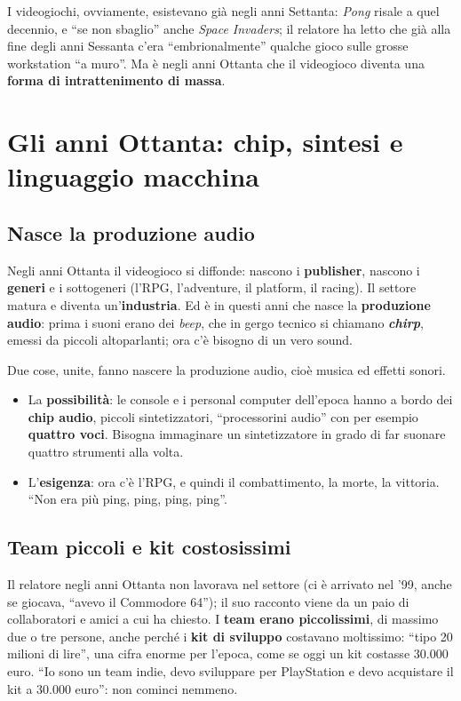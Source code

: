 I videogiochi, ovviamente, esistevano già negli anni Settanta: \emph{Pong} risale
a quel decennio, e ``se non sbaglio'' anche \emph{Space Invaders}; il relatore ha
letto che già alla fine degli anni Sessanta c'era ``embrionalmente'' qualche
gioco sulle grosse workstation ``a muro''. Ma è negli anni Ottanta che il
videogioco diventa una \textbf{forma di intrattenimento di massa}.

\section{Gli anni Ottanta: chip, sintesi e linguaggio macchina}
\label{z9:sec:anni80}

\subsection{Nasce la produzione audio}

Negli anni Ottanta il videogioco si diffonde: nascono i \textbf{publisher},
nascono i \textbf{generi} e i sottogeneri (l'RPG, l'adventure, il platform, il
racing). Il settore matura e diventa un'\textbf{industria}. Ed è in questi anni
che nasce la \textbf{produzione audio}: prima i suoni erano dei \emph{beep}, che
in gergo tecnico si chiamano \textbf{\emph{chirp}}, emessi da piccoli
altoparlanti; ora c'è bisogno di un vero sound.

Due cose, unite, fanno nascere la produzione audio, cioè musica ed effetti
sonori.
\begin{itemize}
  \item La \textbf{possibilità}: le console e i personal computer dell'epoca
        hanno a bordo dei \textbf{chip audio}, piccoli sintetizzatori,
        ``processorini audio'' con per esempio \textbf{quattro voci}. Bisogna
        immaginare un sintetizzatore in grado di far suonare quattro strumenti
        alla volta.
  \item L'\textbf{esigenza}: ora c'è l'RPG, e quindi il combattimento, la morte,
        la vittoria. ``Non era più ping, ping, ping, ping''.
\end{itemize}

\subsection{Team piccoli e kit costosissimi}

Il relatore negli anni Ottanta non lavorava nel settore (ci è arrivato nel '99,
anche se giocava, ``avevo il Commodore 64''); il suo racconto viene da un paio
di collaboratori e amici a cui ha chiesto. I \textbf{team erano piccolissimi},
di massimo due o tre persone, anche perché i \textbf{kit di sviluppo} costavano
moltissimo: ``tipo 20 milioni di lire'', una cifra enorme per l'epoca, come se
oggi un kit costasse 30.000 euro. ``Io sono un team indie, devo sviluppare per
PlayStation e devo acquistare il kit a 30.000 euro'': non cominci nemmeno.

